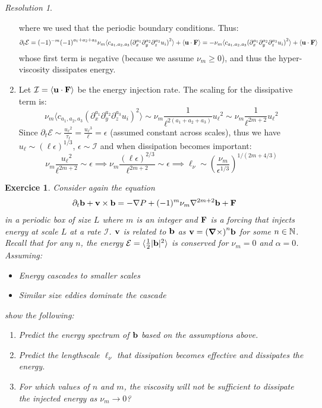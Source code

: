 \documentclass[10pt,a4paper]{article}
\newtheorem{exercici}{Exercice}
\theoremstyle{definition}
\theoremstyle{remark}
\newtheorem*{res}{Resolution}
\begin{document}
\begin{res}
\begin{enumerate}
          where we used that the periodic boundary conditions. Thus:
          $$
            \partial_t\mathcal{E}= (-1)^{-m}{(-1)}^{a_1+a_2+a_3}\nu_m \langle c_{a_1,a_2,a_3}{(\partial_x^{a_1} \partial_y^{a_2} \partial_z^{a_3} u_i)}^2 \rangle + \langle \boldsymbol{\mathrm{u}} \cdot \boldsymbol{\mathrm{F}} \rangle= -\nu_m \langle c_{a_1,a_2,a_3}{(\partial_x^{a_1} \partial_y^{a_2} \partial_z^{a_3} u_i)}^2 \rangle + \langle \boldsymbol{\mathrm{u}} \cdot \boldsymbol{\mathrm{F}} \rangle
          $$
          whose first term is negative (because we assume $\nu_m\geq 0$), and thus the hyper-viscosity dissipates energy.
    \item Let $\mathcal{I}= \langle \boldsymbol{\mathrm{u}} \cdot \boldsymbol{\mathrm{F}} \rangle$ be the energy injection rate. The scaling for the dissipative term is:
          $$
            \nu_m \langle c_{a_1,a_2,a_3}{(\partial_x^{a_1} \partial_y^{a_2} \partial_z^{a_3} u_i)}^2 \rangle \sim \nu_m \frac{1}{\ell^{2(a_1+a_2+a_3)}} {u_{\ell}}^2 \sim \nu_m \frac{1}{\ell^{2m+2}} {u_{\ell}}^2
          $$
          Since $\partial_t \mathcal{E} \sim \frac{{u_\ell}^2}{\tau_\ell}=\frac{{u_\ell}^3}{\ell}=\epsilon$ (assumed constant across scales), thus we have $u_\ell \sim {( \ell \epsilon)}^{1/3}$, $\epsilon\sim \mathcal{I}$ and when dissipation becomes important:
          $$
            \nu_m \frac{{u_{\ell}}^2}{\ell^{2m+2}} \sim \epsilon \implies
            \nu_m \frac{{( \ell \epsilon)}^{2/3}}{\ell^{2m+2}}\sim \epsilon \implies
            \ell_\nu \sim \left(\frac{\nu_m}{\epsilon^{1/3}}\right)^{1/(2m+4/3)}
          $$
  \end{enumerate}
\end{res}
\begin{exercici}
  Consider again the equation
  \begin{gather}
    \partial_t \boldsymbol{\mathrm{b}}+\boldsymbol{\mathrm{v}} \times \boldsymbol{\mathrm{b}} = -\nabla P + (-1)^m \nu_m \nabla^{2m+2} \boldsymbol{\mathrm{b}} + \boldsymbol{\mathrm{F}} \\
  \end{gather}
  in a periodic box of size $L$ where $m$ is an integer and $\boldsymbol{\mathrm{F}}$ is a forcing that injects energy at scale $L$ at a rate $\mathcal{I}$. $\boldsymbol{\mathrm{v}}$ is related to $\boldsymbol{\mathrm{b}}$ as $\boldsymbol{\mathrm{v}} = {(\operatorname{\boldsymbol{\mathrm{\nabla}}\times})}^n \boldsymbol{\mathrm{b}}$ for some $n \in \mathbb{N}$. Recall that for any $n$, the energy $\mathcal{E}= \langle \frac{1}{2} |\boldsymbol{\mathrm{b}}|^2 \rangle$ is conserved for $\nu_m = 0$ and $\alpha = 0$. Assuming:
  \begin{itemize}
    \item Energy cascades to smaller scales
    \item Similar size eddies dominate the cascade
  \end{itemize}
  show the following:
  \begin{enumerate}
    \item Predict the energy spectrum of $\boldsymbol{\mathrm{b}}$ based on the assumptions above.
    \item Predict the lengthscale $\ell_\nu$ that dissipation becomes effective and dissipates the energy.
    \item For which values of $n$ and $m$, the viscosity will not be sufficient to dissipate the injected energy as $\nu_m \to 0$?
  \end{enumerate}
\end{exercici}
\end{document}
